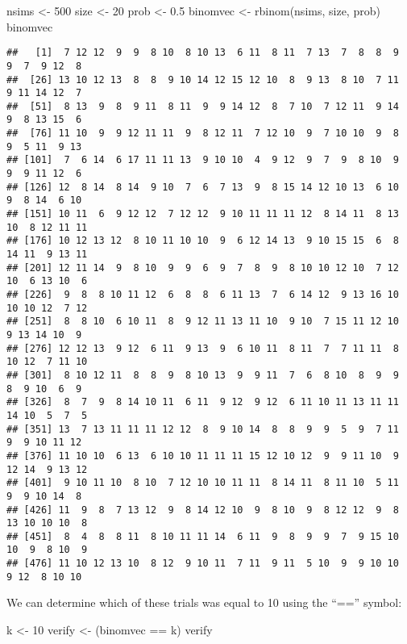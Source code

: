 \documentclass[
]{book}
\newenvironment{Shaded}{\begin{snugshade}}{\end{snugshade}}
\newcommand{\DecValTok}[1]{\textcolor[rgb]{0.00,0.00,0.81}{#1}}
\newcommand{\FloatTok}[1]{\textcolor[rgb]{0.00,0.00,0.81}{#1}}
\newcommand{\FunctionTok}[1]{\textcolor[rgb]{0.00,0.00,0.00}{#1}}
\newcommand{\NormalTok}[1]{#1}
\newcommand{\OtherTok}[1]{\textcolor[rgb]{0.56,0.35,0.01}{#1}}
\newcommand{\SpecialCharTok}[1]{\textcolor[rgb]{0.00,0.00,0.00}{#1}}
\begin{document}
\begin{Shaded}
\begin{Highlighting}[]
\NormalTok{nsims }\OtherTok{\textless{}{-}} \DecValTok{500}
\NormalTok{size }\OtherTok{\textless{}{-}} \DecValTok{20}
\NormalTok{prob }\OtherTok{\textless{}{-}} \FloatTok{0.5}
\NormalTok{binomvec }\OtherTok{\textless{}{-}} \FunctionTok{rbinom}\NormalTok{(nsims, size, prob)}
\NormalTok{binomvec}
\end{Highlighting}
\end{Shaded}

\begin{verbatim}
##   [1]  7 12 12  9  9  8 10  8 10 13  6 11  8 11  7 13  7  8  8  9  9  7  9 12  8
##  [26] 13 10 12 13  8  8  9 10 14 12 15 12 10  8  9 13  8 10  7 11  9 11 14 12  7
##  [51]  8 13  9  8  9 11  8 11  9  9 14 12  8  7 10  7 12 11  9 14  9  8 13 15  6
##  [76] 11 10  9  9 12 11 11  9  8 12 11  7 12 10  9  7 10 10  9  8  9  5 11  9 13
## [101]  7  6 14  6 17 11 11 13  9 10 10  4  9 12  9  7  9  8 10  9  9  9 11 12  6
## [126] 12  8 14  8 14  9 10  7  6  7 13  9  8 15 14 12 10 13  6 10  9  8 14  6 10
## [151] 10 11  6  9 12 12  7 12 12  9 10 11 11 11 12  8 14 11  8 13 10  8 12 11 11
## [176] 10 12 13 12  8 10 11 10 10  9  6 12 14 13  9 10 15 15  6  8 14 11  9 13 11
## [201] 12 11 14  9  8 10  9  9  6  9  7  8  9  8 10 10 12 10  7 12 10  6 13 10  6
## [226]  9  8  8 10 11 12  6  8  8  6 11 13  7  6 14 12  9 13 16 10 10 10 12  7 12
## [251]  8  8 10  6 10 11  8  9 12 11 13 11 10  9 10  7 15 11 12 10  9 13 14 10  9
## [276] 12 12 13  9 12  6 11  9 13  9  6 10 11  8 11  7  7 11 11  8 10 12  7 11 10
## [301]  8 10 12 11  8  8  9  8 10 13  9  9 11  7  6  8 10  8  9  9  8  9 10  6  9
## [326]  8  7  9  8 14 10 11  6 11  9 12  9 12  6 11 10 11 13 11 11 14 10  5  7  5
## [351] 13  7 13 11 11 11 12 12  8  9 10 14  8  8  9  9  5  9  7 11  9  9 10 11 12
## [376] 11 10 10  6 13  6 10 10 11 11 11 15 12 10 12  9  9 11 10  9 12 14  9 13 12
## [401]  9 10 11 10  8 10  7 12 10 10 11 11  8 14 11  8 11 10  5 11  9  9 10 14  8
## [426] 11  9  8  7 13 12  9  8 14 12 10  9  8 10  9  8 12 12  9  8 13 10 10 10  8
## [451]  8  4  8  8 11  8 10 11 11 14  6 11  9  8  9  9  7  9 15 10 10  9  8 10  9
## [476] 11 10 12 13 10  8 12  9 10 11  7 11  9 11  5 10  9  9 10 10  9 12  8 10 10
\end{verbatim}

We can determine which of these trials was equal to 10 using the ``=='' symbol:

\begin{Shaded}
\begin{Highlighting}[]
\NormalTok{k }\OtherTok{\textless{}{-}} \DecValTok{10}
\NormalTok{verify }\OtherTok{\textless{}{-}}\NormalTok{ (binomvec }\SpecialCharTok{==}\NormalTok{ k)}
\NormalTok{verify}
\end{Highlighting}
\end{Shaded}
\end{document}

